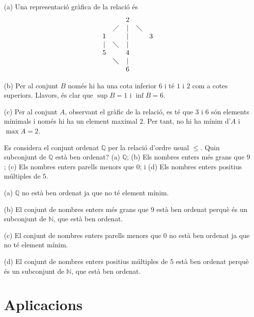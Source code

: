 \begin{solucio}
(a) Una representació gràfica de la relació és%
\begin{equation*}
\begin{array}{ccccc}
&  & 2 &  &  \\
& \diagup & | & \diagdown &  \\
1 &  & | &  & 3 \\
| & \diagdown & | &  &  \\
5 &  & 4 &  &  \\
& \diagdown & | &  &  \\
&  & 6 &  &
\end{array}%
\end{equation*}

(b) Per al conjunt $B$ només hi ha una cota inferior $6$ i té $1$ i $
2$ com a cotes superiors. Llavors, és clar que $\sup B=1$ i $\inf B=6$.

(c) Per al conjunt $A$, observant el gràfic de la relació, es té
que $3$ i $6$ són elements minimals i només hi ha un element maximal
$2$. Per tant, no hi ha mínim d'$A$ i $\max A=2$.
\end{solucio}

\begin{exercici}
Es considera el conjunt ordenat $\mathbb{Q}$ per la relació d'ordre
usual $\leq $. Quin subconjunt de $\mathbb{Q}$ està ben ordenat? (a) $%
\mathbb{Q}$; (b) Els nombres enters més grans que $9$; (c) Els nombres enters
parells menors que $0$; i (d) Els nombres enters positius múltiples de $%
5 $.
\end{exercici}

\begin{solucio}
(a) $\mathbb{Q}$ no està ben ordenat ja que no té element mínim.

(b) El conjunt de nombres enters més grans que $9$ està ben ordenat perquè és un subconjunt de $\mathbb{N}$, que està ben ordenat.

(c) El conjunt de nombres enters parells menors que $0$ no està ben
ordenat ja que no té element mínim.

(d) El conjunt de nombres enters positius múltiples de $5$ està ben
ordenat perquè és un subconjunt de $\mathbb{N}$, que està ben
ordenat.
\end{solucio}

\section{Aplicacions}


